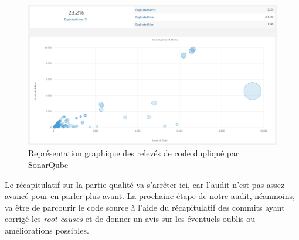 \begin{figure}
  \centering
  \caption{Représentation graphique des relevés de code dupliqué par SonarQube}
  \label{fig:sonar_res}
  \includegraphics[width=\textwidth]{images/sonar_results}
\end{figure}

Le récapitulatif sur la partie qualité va s'arrêter ici, car l'audit n'est pas assez avancé pour en parler plus avant. La prochaine étape de notre audit, néanmoins, va être de parcourir le code source à l'aide du récapitulatif des commits ayant corrigé les \emph{root causes} et de donner un avis sur les éventuels oublis ou améliorations possibles. 